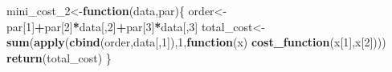\documentclass[
]{article}
\newenvironment{Shaded}{\begin{snugshade}}{\end{snugshade}}
\newcommand{\ControlFlowTok}[1]{\textcolor[rgb]{0.13,0.29,0.53}{\textbf{#1}}}
\newcommand{\DataTypeTok}[1]{\textcolor[rgb]{0.13,0.29,0.53}{#1}}
\newcommand{\DecValTok}[1]{\textcolor[rgb]{0.00,0.00,0.81}{#1}}
\newcommand{\KeywordTok}[1]{\textcolor[rgb]{0.13,0.29,0.53}{\textbf{#1}}}
\newcommand{\NormalTok}[1]{#1}
\newcommand{\OperatorTok}[1]{\textcolor[rgb]{0.81,0.36,0.00}{\textbf{#1}}}
\newcommand{\StringTok}[1]{\textcolor[rgb]{0.31,0.60,0.02}{#1}}
\begin{document}
\begin{Shaded}
\end{Shaded}

\begin{Shaded}
\begin{Highlighting}[]
\NormalTok{mini_cost_}\DecValTok{2}\NormalTok{<-}\ControlFlowTok{function}\NormalTok{(data,par)\{}
\NormalTok{  order<-par[}\DecValTok{1}\NormalTok{]}\OperatorTok{+}\NormalTok{par[}\DecValTok{2}\NormalTok{]}\OperatorTok{*}\NormalTok{data[,}\DecValTok{2}\NormalTok{]}\OperatorTok{+}\NormalTok{par[}\DecValTok{3}\NormalTok{]}\OperatorTok{*}\NormalTok{data[,}\DecValTok{3}\NormalTok{]}
\NormalTok{  total_cost<-}\KeywordTok{sum}\NormalTok{(}\KeywordTok{apply}\NormalTok{(}\KeywordTok{cbind}\NormalTok{(order,data[,}\DecValTok{1}\NormalTok{]),}\DecValTok{1}\NormalTok{,}\ControlFlowTok{function}\NormalTok{(x) }\KeywordTok{cost_function}\NormalTok{(x[}\DecValTok{1}\NormalTok{],x[}\DecValTok{2}\NormalTok{])))}
  \KeywordTok{return}\NormalTok{(total_cost)}
\NormalTok{\}}


\end{Highlighting}
\end{Shaded}
\end{document}
